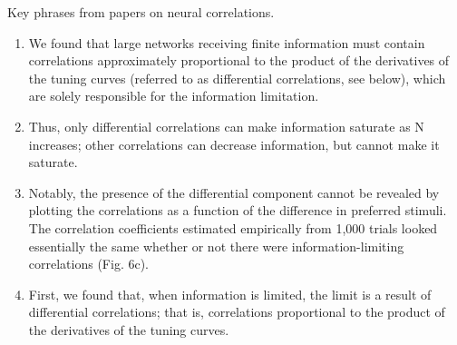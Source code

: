 \documentclass{article}
\begin{document}
	Key phrases from papers on neural correlations.
	\begin{enumerate}
		\item[\parencite{Moreno-Bote2014a}] We found that large networks receiving finite information must contain correlations approximately proportional to the product of the derivatives of the tuning curves (referred to as differential correlations, see below), which are solely responsible for the information limitation.
		\item[\parencite{Moreno-Bote2014a}] Thus, only differential correlations can make information saturate as N increases; other correlations can decrease information, but cannot make it saturate.
		\item[\parencite{Moreno-Bote2014a}] Notably, the presence of the differential component cannot be revealed by plotting the correlations as a function of the difference in preferred stimuli. The correlation coefficients estimated empirically from 1,000 trials looked essentially the same whether or not there were information-limiting correlations (Fig. 6c).
		\item[\parencite{Moreno-Bote2014a}] First, we found that, when information is limited, the limit is a result of differential correlations; that is, correlations proportional to the product of the derivatives of the tuning curves.
	\end{enumerate}
\end{document}
